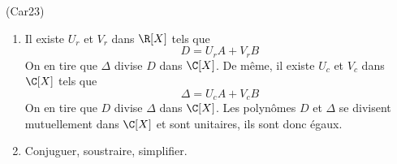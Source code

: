 \begin{tiny}(Car23)\end{tiny}
\begin{enumerate}
 \item Il existe $U_r$ et $V_r$ dans $\R[X]$ tels que 
\begin{displaymath}
 D = U_rA + V_rB
\end{displaymath}
On en tire que $\Delta$ divise $D$ dans $\C[X]$.\newline
De même, il existe $U_c$ et $V_c$ dans $\C[X]$ tels que 
\begin{displaymath}
 \Delta = U_cA + V_cB
\end{displaymath}
On en tire que $D$ divise $\Delta$ dans $\C[X]$. Les polynômes $D$ et $\Delta$ se divisent mutuellement dans $\C[X]$ et sont unitaires, ils sont donc égaux.
 \item Conjuguer, soustraire, simplifier.
\end{enumerate}
